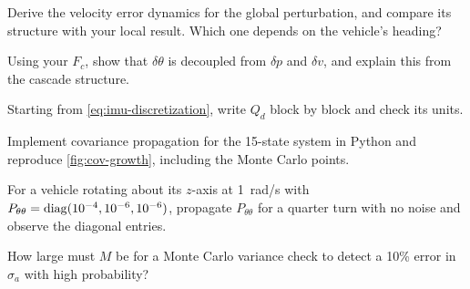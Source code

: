 \begin{exercises}
  \item Derive the velocity error dynamics for the global perturbation, and compare its structure with your local
        result. Which one depends on the vehicle's heading?
  \item Using your $F_c$, show that $\delta\theta$ is decoupled from $\delta p$ and $\delta v$, and explain this from the cascade structure.
  \item Starting from \eqref{eq:imu-discretization}, write $Q_d$ block by block and check its units.
  \item Implement covariance propagation for the 15-state system in Python and reproduce \cref{fig:cov-growth}, including
        the Monte Carlo points.
  \item For a vehicle rotating about its $z$-axis at 1~rad/s with $P_{\theta\theta} = \operatorname{diag}(10^{-4}, 10^{-6}, 10^{-6})$, propagate
        $P_{\theta\theta}$ for a quarter turn with no noise and observe the diagonal entries.
  \item How large must $M$ be for a Monte Carlo variance check to detect a 10\% error in $\sigma_a$ with high probability?
\end{exercises}

